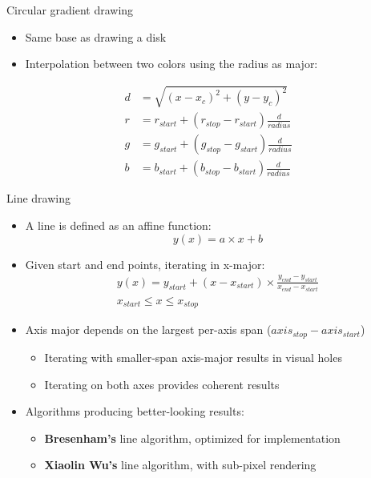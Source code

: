 \begin{frame}{Circular gradient drawing}
  \begin{itemize}
  \item Same base as drawing a disk
  \item Interpolation between two colors using the radius as major:
  \end{itemize}
\begin{align*}
d &= \sqrt{(x - x_c)^2 + (y - y_c)^2}\\
r &= r_{start} + (r_{stop} - r_{start}) \frac{d}{radius}\\
g &= g_{start} + (g_{stop} - g_{start}) \frac{d}{radius}\\
b &= b_{start} + (b_{stop} - b_{start}) \frac{d}{radius}
\end{align*}
\end{frame}

\begin{frame}{Line drawing}
  \begin{itemize}
  \item A line is defined as an affine function:
\[
y(x) = a \times x + b
\]
  \item Given start and end points, iterating in x-major:
\begin{gather*}
y(x) = y_{start} + (x - x_{start}) \times \frac{y_{end} - y_{start}}{x_{end} - x_{start}}\\
x_{start} \leq x \leq x_{stop}
\end{gather*}
  \item Axis major depends on the largest per-axis span (\(axis_{stop} - axis_{start}\))
    \begin{itemize}
    \item Iterating with smaller-span axis-major results in visual holes
    \item Iterating on both axes provides coherent results
    \end{itemize}
  \item Algorithms producing better-looking results:
    \begin{itemize}
    \item \textbf{Bresenham's} line algorithm, optimized for implementation
    \item \textbf{Xiaolin Wu's} line algorithm, with sub-pixel rendering
    \end{itemize}
  \end{itemize}
\end{frame}

